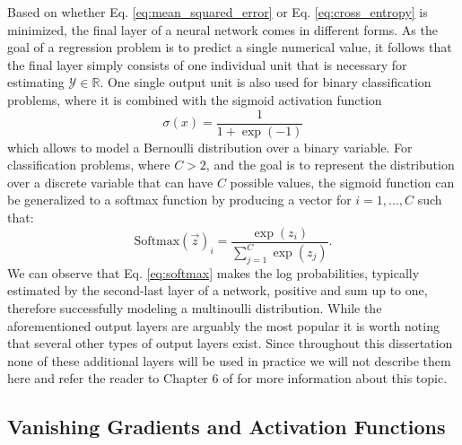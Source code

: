 Based on whether Eq. \ref{eq:mean_squared_error} or Eq. \ref{eq:cross_entropy} is minimized, the final layer of a neural network comes in different forms. As the goal of a regression problem is to predict a single numerical value, it follows that the final layer simply consists of one individual unit that is necessary for estimating $\mathcal{Y}\in\mathds{R}$. One single output unit is also used for binary classification problems, where it is combined with the sigmoid activation function
\begin{equation}
	\sigma(x) = \frac{1}{1+\exp(-1)}
	\label{eq:sigmoid}
\end{equation}
which allows to model a Bernoulli distribution over a binary variable. For classification problems, where $C>2$, and the goal is to represent the distribution over a discrete variable that can have $C$ possible values, the sigmoid function can be generalized to a softmax function by producing a vector for $i=1,...,C$ such that:
\begin{equation}
	\text{Softmax}(\vec{z})_i = \frac{\exp(z_i)}{\sum_{j=1}^{C} \exp(z_j)}.
	\label{eq:softmax}
\end{equation}
We can observe that Eq. \ref{eq:softmax} makes the log probabilities, typically estimated by the second-last layer of a network, positive and sum up to one, therefore successfully modeling a multinoulli distribution. While the aforementioned output layers are arguably the most popular it is worth noting that several other types of output layers exist. Since throughout this dissertation none of these additional layers will be used in practice we will not describe them here and refer the reader to Chapter 6 of \cite{goodfellow2016deep} for more information about this topic.

\subsection{Vanishing Gradients and Activation Functions}
\label{sec:activation_functions}

